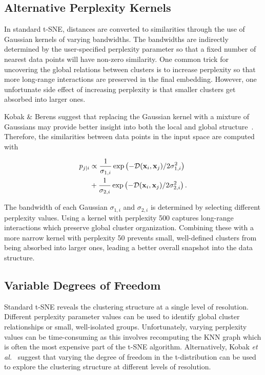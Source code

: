 \documentclass[twocolumn]{bmcart}
\begin{document}
\subsection*{Alternative Perplexity Kernels}

In standard t-SNE, distances are converted to similarities through the use of
Gaussian kernels of varying bandwidths. The bandwidths are indirectly
determined by the user-specified perplexity parameter so that a fixed number of
nearest data points will have non-zero similarity. One common trick for
uncovering the global relations between clusters is to increase perplexity so
that more long-range interactions are preserved in the final embedding.
However, one unfortunate side effect of increasing perplexity is that smaller
clusters get absorbed into larger ones.

Kobak \& Berens suggest that replacing the Gaussian kernel
with a mixture of Gaussians may provide better insight into both the local and
global structure~\cite{kobak2019art}. Therefore, the similarities between data points in the input
space are computed with

\begin{align}
  p_{j\mid i} &\propto \frac{1}{\sigma_{1,i}} \exp \left ( -\mathcal{D}(\mathbf{x}_i, \mathbf{x}_j ) / 2\sigma_{1,i}^2 \right ) \notag \\
  &+ \frac{1}{\sigma_{2,i}} \exp \left ( -\mathcal{D}(\mathbf{x}_i, \mathbf{x}_j ) / 2\sigma_{2,i}^2 \right ).
\end{align}

The bandwidth of each Gaussian $\sigma_{1,i}$ and $\sigma_{2,i}$ is determined
by selecting different perplexity values. Using a kernel with
perplexity 500 captures long-range interactions which preserve global
cluster organization. Combining these with a more narrow kernel with
perplexity 50 prevents small, well-defined clusters from being absorbed
into larger ones, leading a better overall snapshot into the data structure.

\subsection*{Variable Degrees of Freedom}

Standard t-SNE reveals the clustering structure at a single level of
resolution. Different perplexity parameter values can be used to identify
global cluster relationships or small, well-isolated groups. Unfortunately,
varying perplexity values can be time-consuming as this involves recomputing
the KNN graph which is often the most expensive part of the t-SNE algorithm.
Alternatively, Kobak \textit{et al.}~\cite{kobak2019heavy} suggest that varying
the degree of freedom in the t-distribution can be used to explore the clustering structure at different
levels of resolution. 
\end{document}
